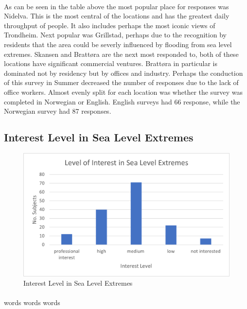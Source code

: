\paragraph{}

As can be seen in the table above the most popular place for responses was Nidelva. This is the most central of the locations and has  the greatest daily throughput of people. It also includes perhaps the most iconic views of Trondheim. Next popular was Grillstad, perhaps due to the recognition by residents that the area could be severly influenced by flooding from sea level extremes. Skansen and Brattøra are the next most responded to, both of these locations have significant commercial ventures. Brattøra in particular is dominated not by residency but by offices and industry. Perhaps the conduction of this survey in Summer decreased the number of responses due to the lack of office workers. 
Almost evenly split for each location was whether the survey was completed in Norwegian or English. English surveys had 66 response, while the Norwegian survey had 87 responses.  

\subsection{Interest Level in Sea Level Extremes}

\begin{figure}[h]
    \centering
    \includegraphics{fig_results/interest-level.png}
    \caption{Interest Level in Sea Level Extremes}
    \label{fig:my_label}
\end{figure}
\paragraph{}
words words words


